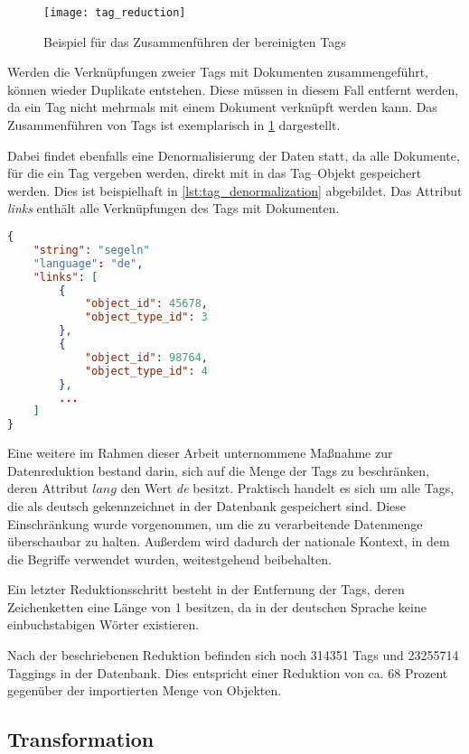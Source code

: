\begin{figure}[h]
\centering
\texttt{[image: tag\_reduction]}
\caption{Beispiel für das Zusammenführen der bereinigten Tags}
\label{fig:tag_reduction}
\end{figure}

Werden die Verknüpfungen zweier Tags mit Dokumenten zusammengeführt, können wieder Duplikate entstehen. Diese müssen in diesem Fall entfernt werden, da ein Tag nicht mehrmals mit einem Dokument verknüpft werden kann. Das Zusammenführen von Tags ist exemplarisch in \cref{fig:tag_reduction} dargestellt.

Dabei findet ebenfalls eine Denormalisierung der Daten statt, da alle Dokumente, für die ein Tag vergeben werden, direkt mit in das Tag--Objekt gespeichert werden. Dies ist beispielhaft in \cref{lst:tag_denormalization} abgebildet. Das Attribut \emph{links} enthält alle Verknüpfungen des Tags mit Dokumenten.

\begin{lstlisting}[language=json, label={lst:tag_denormalization}, caption={JSON--Beispiel für die denormalisierten Tagging-Daten}, float=t]
{
    "string": "segeln"
    "language": "de",
    "links": [
        {
            "object_id": 45678, 
            "object_type_id": 3
        },
        {
            "object_id": 98764, 
            "object_type_id": 4
        },
        ...
    ]
}
\end{lstlisting}

Eine weitere im Rahmen dieser Arbeit unternommene Maßnahme zur Datenreduktion bestand darin, sich auf die Menge der Tags zu beschränken, deren Attribut \(lang\) den Wert \emph{de} besitzt. Praktisch handelt es sich um alle Tags, die als deutsch gekennzeichnet in der Datenbank gespeichert sind. Diese Einschränkung wurde vorgenommen, um die zu verarbeitende Datenmenge überschaubar zu halten. Außerdem wird dadurch der nationale Kontext, in dem die Begriffe verwendet wurden, weitestgehend beibehalten.

Ein letzter Reduktionsschritt besteht in der Entfernung der Tags, deren Zeichenketten eine Länge von \num{1} besitzen, da in der deutschen Sprache keine einbuchstabigen Wörter existieren.

Nach der beschriebenen Reduktion befinden sich noch \num{314351} Tags und \num{23255714} Taggings in der Datenbank. Dies entspricht einer Reduktion von ca. \num{68} Prozent gegenüber der importierten Menge von Objekten.

\subsection{Transformation}

